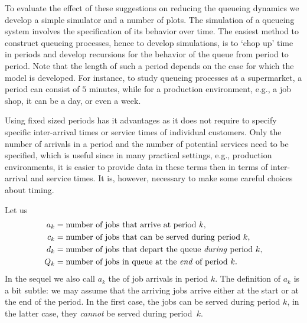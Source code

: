 To evaluate the effect of these suggestions on reducing the queueing
dynamics we develop a simple simulator and a number of plots. The
simulation of a queueing system involves the specification of its
behavior over time.  The easiest method to construct queueing
processes, hence to develop simulations, is to `chop up' time in
periods and develop recursions for the behavior of the queue from
period to period. Note that the length of such a period depends on the
case for which the model is developed.  For instance, to study
queueing processes at a supermarket, a period can consist of $5$
minutes, while for a production environment, e.g., a job shop, it can
be a day, or even a week.

Using fixed sized periods has it advantages as it does not require to
specify specific inter-arrival times or service times of individual
customers. Only the number of arrivals in a period and the number of
potential services need to be specified, which is useful since in many
practical settings, e.g., production environments, it is easier to
provide data in these terms then in terms of inter-arrival and service
times. It is, however, necessary to make some careful choices about
timing.

Let us 
\begin{equation}
  \label{eq:30}
  \begin{split}
    a_k &= \text{number of jobs that arrive at period $k$},\\
    c_k &= \text{number of jobs that can be served during period $k$},\\
    d_k &= \text{number of jobs that depart the queue  \textit{during} period $k$},\\
    Q_k &= \text{number of jobs in queue  at the \textit{end} of period $k$}.\\
  \end{split}
\end{equation}
In the sequel we also call $a_k$ the  of job arrivals in
period $k$. The definition of $a_k$ is a bit subtle: we may assume
that the arriving jobs arrive either at the start or at the end of the
period. In the first case, the jobs can be served during period $k$,
in the latter case, they \emph{cannot} be served during period~$k$.



